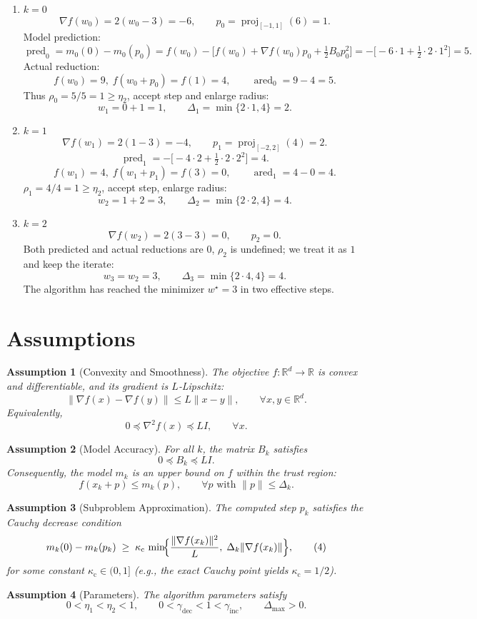 \documentclass{article}
\newtheorem{assumption}{Assumption}
\begin{document}
\begin{enumerate}[label=\textbf{Iter \arabic*:},leftmargin=*]
\item $k=0$  
\[
\nabla f(w_0)=2(w_0-3)=-6,\qquad p_0=\operatorname{proj}_{[-1,1]}(6)=1.
\]
Model prediction:
\[
\operatorname{pred}_0 = m_0(0)-m_0(p_0)
 = f(w_0)-\bigl[f(w_0)+\nabla f(w_0)p_0+\tfrac12 B_0p_0^2\bigr]
 = -\bigl[-6\cdot1+\tfrac12\cdot2\cdot1^2\bigr]=5.
\]
Actual reduction:
\[
f(w_0)=9,\;f(w_0+p_0)=f(1)=4,\qquad 
\operatorname{ared}_0 =9-4=5.
\]
Thus $\rho_0=5/5=1\ge\eta_2$, accept step and enlarge radius:
\[
w_1=0+1=1,\qquad \Delta_1=\min\{2\cdot1,4\}=2.
\]

\item $k=1$  
\[
\nabla f(w_1)=2(1-3)=-4,\qquad p_1=\operatorname{proj}_{[-2,2]}(4)=2.
\]
\[
\operatorname{pred}_1 = -\bigl[-4\cdot2+\tfrac12\cdot2\cdot2^2\bigr]=4.
\]
\[
f(w_1)=4,\;f(w_1+p_1)=f(3)=0,\qquad 
\operatorname{ared}_1 =4-0=4.
\]
$\rho_1=4/4=1\ge\eta_2$, accept step, enlarge radius:
\[
w_2=1+2=3,\qquad \Delta_2=\min\{2\cdot2,4\}=4.
\]

\item $k=2$  
\[
\nabla f(w_2)=2(3-3)=0,\qquad p_2=0.
\]
Both predicted and actual reductions are $0$, $\rho_2$ is undefined; we treat it as $1$ and keep the iterate:
\[
w_3=w_2=3,\qquad \Delta_3=\min\{2\cdot4,4\}=4.
\]
The algorithm has reached the minimizer $w^\star=3$ in two effective steps.
\end{enumerate}

\section*{Assumptions}
\begin{assumption}[Convexity and Smoothness]\label{assump:convex}
The objective $f:\mathbb{R}^{d}\to\mathbb{R}$ is convex and differentiable, and its gradient is $L$‑Lipschitz:
\[
\|\nabla f(x)-\nabla f(y)\|\le L\|x-y\|,\qquad\forall x,y\in\mathbb{R}^{d}.
\]
Equivalently,
\[
0\preceq \nabla^{2}f(x)\preceq L I,\qquad\forall x.
\]
\end{assumption}
\begin{assumption}[Model Accuracy]\label{assump:model}
For all $k$, the matrix $B_k$ satisfies
\[
0\preceq B_k\preceq L I .
\]
Consequently, the model $m_k$ is an upper bound on $f$ within the trust region:
\[
f(x_k+p)\le m_k(p),\qquad \forall p\text{ with }\|p\|\le\Delta_k .
\]
\end{assumption}
\begin{assumption}[Subproblem Approximation]\label{assump:approx}
The computed step $p_k$ satisfies the \emph{Cauchy decrease} condition
\[
m_k(0)-m_k(p_k)\;\ge\;\kappa_{\mathrm{c}}\,
\min\!\Bigl\{\frac{\|\nabla f(x_k)\|^{2}}{L},\;
\Delta_k\|\nabla f(x_k)\|\Bigr\},
\tag{4}
\]
for some constant $\kappa_{\mathrm{c}}\in(0,1]$ (e.g., the exact Cauchy point yields $\kappa_{\mathrm{c}}=1/2$).
\end{assumption}
\begin{assumption}[Parameters]\label{assump:params}
The algorithm parameters satisfy
\[
0<\eta_1<\eta_2<1,\qquad
0<\gamma_{\text{dec}}<1<\gamma_{\text{inc}},\qquad
\Delta_{\max}>0.
\]
\end{assumption}
\end{document}
